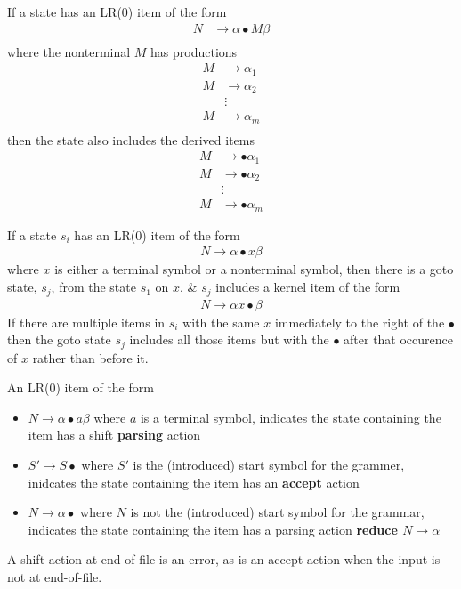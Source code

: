 If a state has an LR(0) item of the form
\begin{align*}
    N &\rightarrow \alpha \bullet M \beta \\
\end{align*}
where the nonterminal $M$ has productions
\begin{align*}
    M &\rightarrow \alpha_1 \\
    M &\rightarrow \alpha_2 \\
    &\vdots \\
    M &\rightarrow \alpha_m \\
\end{align*}
then the state also includes the derived items
\begin{align*}
    M &\rightarrow \bullet \alpha_1 \\
    M &\rightarrow \bullet \alpha_2 \\
    &\vdots \\
    M &\rightarrow \bullet \alpha_m
\end{align*}

If a state $s_i$ has an LR(0) item of the form
\begin{align*}
    N \rightarrow \alpha \bullet x \beta
\end{align*}
where $x$ is either a terminal symbol or a nonterminal symbol, then there is a goto state, 
$s_j$, from the state $s_1$ on $x$, \& $s_j$ includes a kernel item of the form
\begin{align*}
    N \rightarrow \alpha x \bullet \beta
\end{align*}
If there are multiple items in $s_i$ with the same $x$ immediately to the right of the 
$\bullet$ then the goto state $s_j$ includes all those items but with the $\bullet$ after 
that occurence of $x$ rather than before it.

An LR(0) item of the form
\begin{itemize}
    \item $N \rightarrow \alpha \bullet a \beta$ where $a$ is a terminal symbol, indicates 
    the state containing the item has a shift  \textbf{parsing} action
    \item $S' \rightarrow S \bullet$ where $S'$ is the (introduced) start symbol for the 
    grammer, inidcates the state containing the item has an  \textbf{accept} action
    \item $N \rightarrow \alpha \bullet$ where $N$ is not the (introduced) start symbol for 
    the grammar, indicates the state containing the item has a parsing action 
    \textbf{reduce $N \rightarrow \alpha$}
\end{itemize}
A shift action at end-of-file is an error, as is an accept action when the input is not at 
end-of-file.

